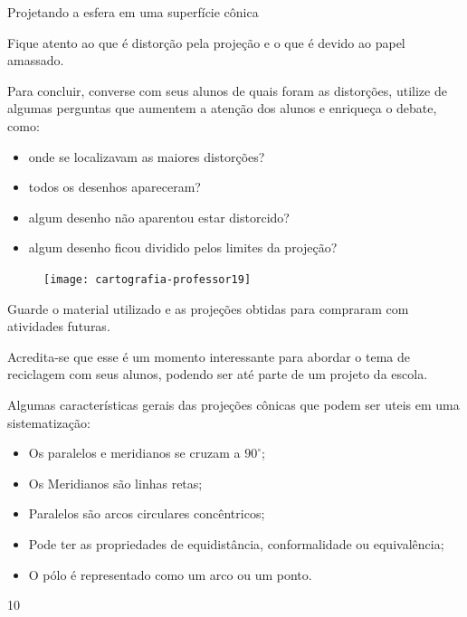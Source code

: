 \clearmargin
\begin{Recomenda}{Projetando a esfera em uma superfície cônica}
{


  Fique atento ao que é distorção pela projeção e o que é devido ao papel amassado.

  Para concluir, converse com seus alunos de quais foram as distorções, utilize de algumas perguntas que aumentem a atenção dos alunos e enriqueça o debate, como:

  \begin{itemize}
  \item onde se localizavam as maiores distorções?
  \item todos os desenhos apareceram?
  \item algum desenho não aparentou estar distorcido?
  \item algum desenho ficou dividido pelos limites da projeção?
  \end{itemize}

  \begin{figure}[H]
  \centering
  
  \texttt{[image: cartografia-professor19]}
  \end{figure}

  Guarde o material utilizado e as projeções obtidas para compraram com atividades futuras.

  Acredita-se que esse é um momento interessante para abordar o tema de reciclagem com seus alunos, podendo ser até parte de um projeto da escola.

  Algumas características gerais das projeções cônicas que podem ser uteis em uma sistematização:
  \begin{itemize}
  \item Os paralelos e meridianos se cruzam a $90^{\circ}$;
  \item Os Meridianos são linhas retas;
  \item Paralelos são arcos circulares concêntricos;
  \item Pode ter as propriedades de equidistância, conformalidade ou equivalência;
  \item O pólo é representado como um arco ou um ponto.
  \end{itemize}
}{1}{0}
\end{Recomenda}


\label{Pconica}

